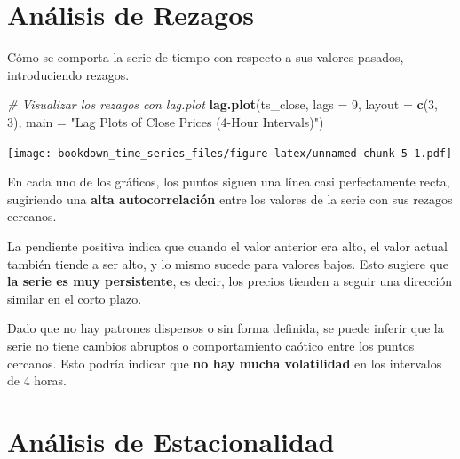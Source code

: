 \documentclass[
]{book}
\newenvironment{Shaded}{\begin{snugshade}}{\end{snugshade}}
\newcommand{\AttributeTok}[1]{\textcolor[rgb]{0.13,0.29,0.53}{#1}}
\newcommand{\CommentTok}[1]{\textcolor[rgb]{0.56,0.35,0.01}{\textit{#1}}}
\newcommand{\DecValTok}[1]{\textcolor[rgb]{0.00,0.00,0.81}{#1}}
\newcommand{\FunctionTok}[1]{\textcolor[rgb]{0.13,0.29,0.53}{\textbf{#1}}}
\newcommand{\NormalTok}[1]{#1}
\newcommand{\OtherTok}[1]{\textcolor[rgb]{0.56,0.35,0.01}{#1}}
\newcommand{\SpecialCharTok}[1]{\textcolor[rgb]{0.81,0.36,0.00}{\textbf{#1}}}
\newcommand{\StringTok}[1]{\textcolor[rgb]{0.31,0.60,0.02}{#1}}
\begin{document}
\section{Análisis de Rezagos}\label{anuxe1lisis-de-rezagos}

Cómo se comporta la serie de tiempo con respecto a sus valores pasados, introduciendo rezagos.

\begin{Shaded}
\end{Shaded}

\begin{Shaded}
\begin{Highlighting}[]
\CommentTok{\# Visualizar los rezagos con lag.plot}
\FunctionTok{lag.plot}\NormalTok{(ts\_close, }\AttributeTok{lags =} \DecValTok{9}\NormalTok{, }\AttributeTok{layout =} \FunctionTok{c}\NormalTok{(}\DecValTok{3}\NormalTok{, }\DecValTok{3}\NormalTok{), }\AttributeTok{main =} \StringTok{"Lag Plots of Close Prices (4{-}Hour Intervals)"}\NormalTok{)}
\end{Highlighting}
\end{Shaded}

\texttt{[image: bookdown\_time\_series\_files/figure-latex/unnamed-chunk-5-1.pdf]}

En cada uno de los gráficos, los puntos siguen una línea casi perfectamente recta, sugiriendo una \textbf{alta autocorrelación} entre los valores de la serie con sus rezagos cercanos.

La pendiente positiva indica que cuando el valor anterior era alto, el valor actual también tiende a ser alto, y lo mismo sucede para valores bajos. Esto sugiere que \textbf{la serie es muy persistente}, es decir, los precios tienden a seguir una dirección similar en el corto plazo.

Dado que no hay patrones dispersos o sin forma definida, se puede inferir que la serie no tiene cambios abruptos o comportamiento caótico entre los puntos cercanos. Esto podría indicar que \textbf{no hay mucha volatilidad} en los intervalos de 4 horas.

\section{Análisis de Estacionalidad}\label{anuxe1lisis-de-estacionalidad}
\end{document}
